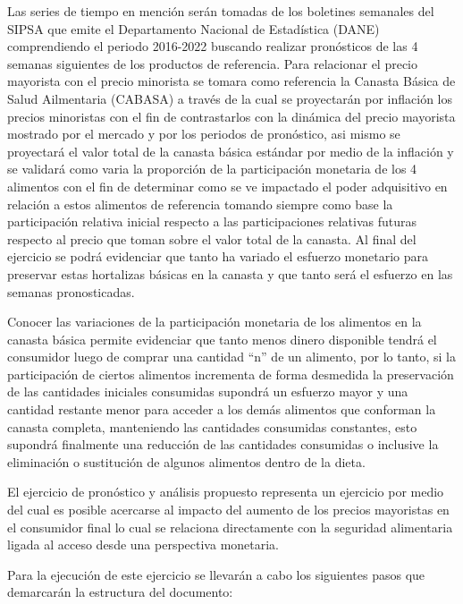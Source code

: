 \documentclass[
]{book}
\begin{document}
Las series de tiempo en mención serán tomadas de los boletines semanales del SIPSA que emite el Departamento Nacional de Estadística (DANE) comprendiendo el periodo 2016-2022 buscando realizar pronósticos de las 4 semanas siguientes de los productos de referencia. Para relacionar el precio mayorista con el precio minorista se tomara como referencia la Canasta Básica de Salud Ailmentaria (CABASA) a través de la cual se proyectarán por inflación los precios minoristas con el fin de contrastarlos con la dinámica del precio mayorista mostrado por el mercado y por los periodos de pronóstico, asi mismo se proyectará el valor total de la canasta básica estándar por medio de la inflación y se validará como varia la proporción de la participación monetaria de los 4 alimentos con el fin de determinar como se ve impactado el poder adquisitivo en relación a estos alimentos de referencia tomando siempre como base la participación relativa inicial respecto a las participaciones relativas futuras respecto al precio que toman sobre el valor total de la canasta. Al final del ejercicio se podrá evidenciar que tanto ha variado el esfuerzo monetario para preservar estas hortalizas básicas en la canasta y que tanto será el esfuerzo en las semanas pronosticadas.

Conocer las variaciones de la participación monetaria de los alimentos en la canasta básica permite evidenciar que tanto menos dinero disponible tendrá el consumidor luego de comprar una cantidad ``n'' de un alimento, por lo tanto, si la participación de ciertos alimentos incrementa de forma desmedida la preservación de las cantidades iniciales consumidas supondrá un esfuerzo mayor y una cantidad restante menor para acceder a los demás alimentos que conforman la canasta completa, manteniendo las cantidades consumidas constantes, esto supondrá finalmente una reducción de las cantidades consumidas o inclusive la eliminación o sustitución de algunos alimentos dentro de la dieta.

El ejercicio de pronóstico y análisis propuesto representa un ejercicio por medio del cual es posible acercarse al impacto del aumento de los precios mayoristas en el consumidor final lo cual se relaciona directamente con la seguridad alimentaria ligada al acceso desde una perspectiva monetaria.

Para la ejecución de este ejercicio se llevarán a cabo los siguientes pasos que demarcarán la estructura del documento:
\end{document}
